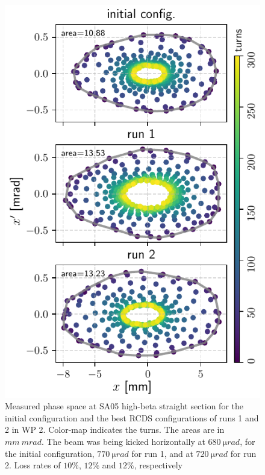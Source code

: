 \begin{figure}[!h]
    \hfill
    \begin{minipage}{0.48\textwidth}
        \includegraphics[width=\textwidth]{Images/WEPL087_f4.pdf}
        \caption{Measured phase space at SA05 high-beta straight section for the initial configuration and the best RCDS configurations of runs 1 and 2 in WP 2. Color-map indicates the turns. The areas are in $\unit{mm}~\unit{mrad}$. The beam was being kicked horizontally at $680~\unit{\micro rad}$, for the initial configuration, $770~\unit{\micro rad}$ for run 1, and at $720~\unit{\micro rad}$ for run 2. Loss rates of $10\%$, $12\%$ and $12\%$, respectively}
        \label{fig:newtunes_phase}
    \end{minipage}

\end{figure}
